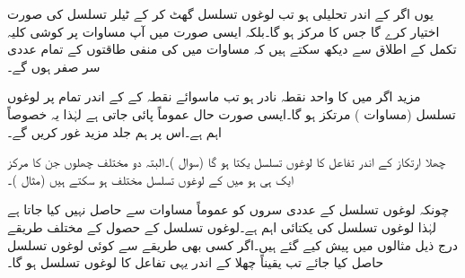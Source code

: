 یوں اگر  کے اندر  تحلیلی ہو تب لوغوں تسلسل  گھٹ کر  کے ٹیلر تسلسل کی صورت اختیار کرے گا جس کا مرکز  ہو گا۔بلکہ ایسی صورت میں آپ مساوات  پر کوشی  کلیہ تکمل کے اطلاق سے دیکھ سکتے ہیں کہ مساوات  میں   کی منفی طاقتوں کے تمام عددی سر صفر ہوں گے۔

مزید اگر  میں  کا  واحد نقطہ نادر  ہو تب ماسوائے نقطہ  کے  کے اندر تمام  پر  لوغوں تسلسل (مساوات ) مرتکز ہو گا۔ایسی صورت حال عموماً پائی جاتی ہے لہٰذا یہ خصوصاً  اہم ہے۔اس پر ہم جلد مزید غور کریں گے۔

چھلا ارتکاز کے اندر تفاعل  کا لوغوں تسلسل یکتا ہو گا (سوال )۔البتہ دو مختلف چھلوں جن کا مرکز ایک ہی ہو میں  کے لوغوں تسلسل مختلف ہو سکتے ہیں (مثال )۔

چونکہ لوغوں تسلسل کے عددی سروں کو عموماً مساوات  سے حاصل نہیں کیا جاتا ہے لہٰذا لوغوں تسلسل کی یکتائی اہم ہے۔لوغوں تسلسل کے حصول کے مختلف طریقے درج ذیل مثالوں میں پیش کیے گئے ہیں۔اگر کسی بھی طریقے  سے کوئی لوغوں تسلسل حاصل کیا جائے تب یقیناً چھلا کے اندر یہی تفاعل کا لوغوں تسلسل ہو گا۔ 

